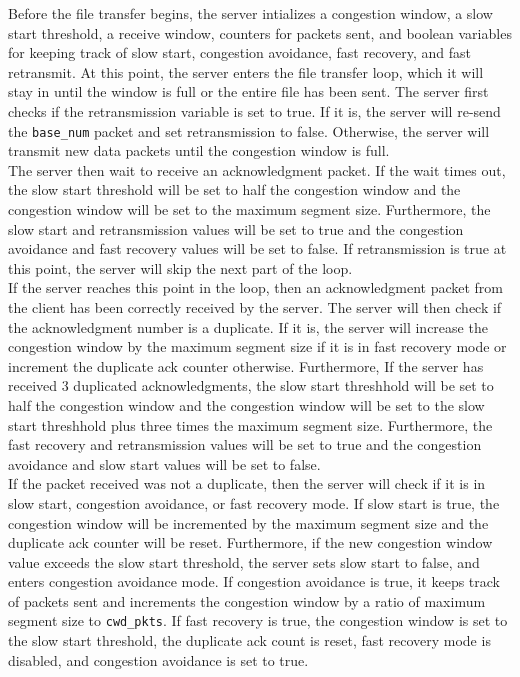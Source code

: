 \documentclass{article}
\begin{document}
\noindent
Before the file transfer begins, the server intializes a congestion window, a slow start threshold, a receive window, counters for packets sent, and boolean variables for keeping track of slow start, congestion avoidance, fast recovery, and fast retransmit. At this point, the server enters the file transfer loop, which it will stay in until the window is full or the entire file has been sent. The server first checks if the retransmission variable is set to true. If it is, the server will re-send the \texttt{base\_num} packet and set retransmission to false. Otherwise, the server will transmit new data packets until the congestion window is full. \\ 

\noindent
The server then wait to receive an acknowledgment packet. If the wait times out, the slow start threshold will be set to half the congestion window and the congestion window will be set to the maximum segment size. Furthermore, the slow start and retransmission values will be set to true and the congestion avoidance and fast recovery values will be set to false. If retransmission is true at this point, the server will skip the next part of the loop. \\

\noindent
If the server reaches this point in the loop, then an acknowledgment packet from the client has been correctly received by the server. The server will then check if the acknowledgment number is a duplicate. If it is, the server will increase the congestion window by the maximum segment size if it is in fast recovery mode or increment the duplicate ack counter otherwise. Furthermore, If the server has received 3 duplicated acknowledgments, the slow start threshhold will be set to half the congestion window and the congestion window will be set to the slow start threshhold plus three times the maximum segment size. Furthermore, the fast recovery and retransmission values will be set to true and the congestion avoidance and slow start values will be set to false. \\

\noindent
If the packet received was not a duplicate, then the server will check if it is in slow start, congestion avoidance, or fast recovery mode. If slow start is true, the congestion window will be incremented by the maximum segment size and the duplicate ack counter will be reset. Furthermore, if the new congestion window value exceeds the slow start threshold, the server sets slow start to false, and enters congestion avoidance mode. If congestion avoidance is true, it keeps track of packets sent and increments the congestion window by a ratio of maximum segment size to \texttt{cwd\_pkts}. If fast recovery is true, the congestion window is set to the slow start threshold, the duplicate ack count is reset, fast recovery mode is disabled, and congestion avoidance is set to true. \\
\end{document}
